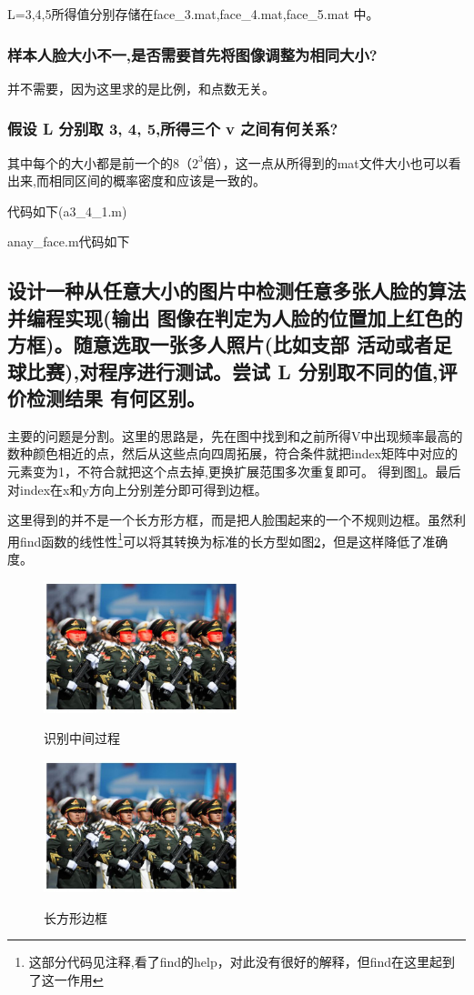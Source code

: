 \documentclass{ctexart}
\begin{document}
L=3,4,5所得值分别存储在face\_3.mat,face\_4.mat,face\_5.mat 中。
\subsubsection{样本人脸大小不一,是否需要首先将图像调整为相同大小?}
并不需要，因为这里求的是比例，和点数无关。
\subsubsection{假设 L 分别取 3, 4, 5,所得三个 v 之间有何关系?}    
其中每个的大小都是前一个的8（$2^3$倍），这一点从所得到的mat文件大小也可以看出来,而相同区间的概率密度和应该是一致的。

代码如下(a3\_4\_1.m)


anay\_face.m代码如下

\subsection{设计一种从任意大小的图片中检测任意多张人脸的算法并编程实现(输出
图像在判定为人脸的位置加上红色的方框)。随意选取一张多人照片(比如支部
活动或者足球比赛),对程序进行测试。尝试 L 分别取不同的值,评价检测结果
有何区别。}
主要的问题是分割。这里的思路是，先在图中找到和之前所得V中出现频率最高的数种颜色相近的点，然后从这些点向四周拓展，符合条件就把index矩阵中对应的元素变为1，不符合就把这个点去掉,更换扩展范围多次重复即可。
得到图\ref{mid}。最后对index在x和y方向上分别差分即可得到边框。

这里得到的并不是一个长方形方框，而是把人脸围起来的一个不规则边框。虽然利用find函数的线性性\footnote{这部分代码见注释,看了find的help，对此没有很好的解释，但find在这里起到了这一作用}可以将其转换为标准的长方型如图\ref{a342rec}，但是这样降低了准确度。
\begin{figure}
    \centering
    \includegraphics[width=0.5\textwidth]{pic/mid.jpg}\\
    \caption{识别中间过程\label{mid}}
\end{figure}
\begin{figure}
    \centering
    \includegraphics[width=0.5\textwidth]{pic/ex2_renc.jpg}\\
    \caption{长方形边框\label{a342rec}}
\end{figure}
\end{document}
